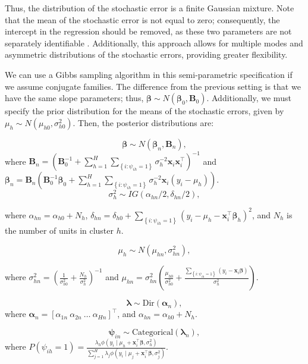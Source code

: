 Thus, the distribution of the stochastic error is a finite Gaussian mixture. Note that the mean of the stochastic error is not equal to zero; consequently, the intercept in the regression should be removed, as these two parameters are not separately identifiable \cite{van2011bayesian}. Additionally, this approach allows for multiple modes and asymmetric distributions of the stochastic errors, providing greater flexibility.

We can use a Gibbs sampling algorithm in this semi-parametric specification if we assume conjugate families. The difference from the previous setting is that we have the same slope parameters; thus, $\boldsymbol{\beta} \sim N(\boldsymbol{\beta}_{0},\boldsymbol{B}_{0})$. Additionally, we must specify the prior distribution for the means of the stochastic errors, given by $\mu_h \sim N(\mu_{h0},\sigma^2_{h 0})$. Then, the posterior distributions are:

$$\boldsymbol{\beta}\sim N(\boldsymbol{\beta}_{n},\boldsymbol{B}_{n}),$$ where $\boldsymbol{B}_{n}=(\boldsymbol{B}_{0}^{-1}+\sum_{h=1}^H\sum_{\left\{i:  \psi_{ih}=1\right\}}\sigma_h^{-2}\boldsymbol{x}_i\boldsymbol{x}_i^{\top})^{-1}$ and $\boldsymbol{\beta}_{n}=\boldsymbol{B}_{n}(\boldsymbol{B}_{0}^{-1}\boldsymbol{\beta}_{0}+\sum_{h=1}^H\sum_{\left\{i:  \psi_{ih}=1\right\}}\sigma_h^{-2}\boldsymbol{x}_i(y_i-\mu_h))$.
$$\sigma_h^2\sim IG(\alpha_{hn}/2,\delta_{hn}/2),$$

where $\alpha_{hn}=\alpha_{h0}+N_h$, $\delta_{hn}=\delta_{h0}+\sum_{\left\{i:  \psi_{ih}=1\right\}}(y_i-\mu_h-\boldsymbol{x}_i^{\top}\boldsymbol{\beta}_h)^2$, and $N_h$ is the number of units in cluster $h$.

$$\mu_h\sim N(\mu_{hn},\sigma_{hn}^2),$$

where $\sigma_{hn}^2=\left(\frac{1}{\sigma_{h 0}^{2}}+\frac{N_h}{\sigma_{h}^2}\right)^{-1}$ and $\mu_{hn}=\sigma_{hn}^2\left(\frac{\mu_{h0}}{\sigma_{h0}^2}+\frac{\sum_{\left\{i:\psi_{ih}=1\right\}} (y_i-\boldsymbol{x}_i\boldsymbol{\beta})}{\sigma_h^2}\right)$.

$$\boldsymbol{\lambda}\sim \text{Dir}(\boldsymbol{\alpha}_n),$$   
where $\boldsymbol{\alpha}_n=[\alpha_{1n} \  \alpha_{2n} \ \dots \ \alpha_{Hn}]^{\top}$, and $\alpha_{hn}=\alpha_{h0}+N_h$.

$$\boldsymbol{\psi}_{in}\sim \text{Categorical}(\boldsymbol{\lambda}_n),$$
where $P(\psi_{ih}=1)=\frac{\lambda_{h}\phi(y_i\mid \mu_h+\boldsymbol{x}_i^{\top}\boldsymbol{\beta},\sigma_h^2)}{\sum_{j=1}^H\lambda_{j}\phi(y_i\mid \mu_j+\boldsymbol{x}_i^{\top}\boldsymbol{\beta},\sigma_j^2)}$.
 
